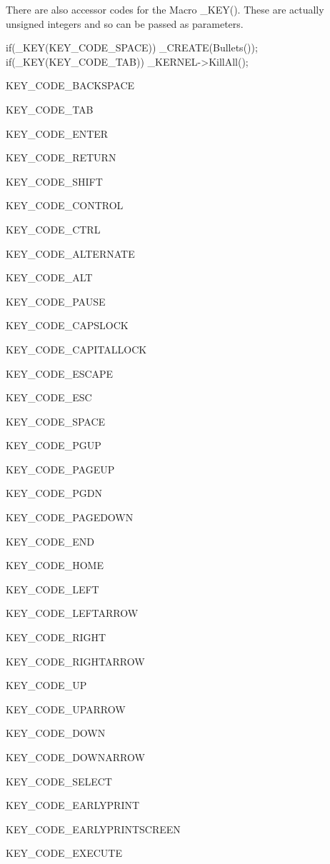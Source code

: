There are also accessor codes for the Macro \_\-KEY(). These are actually unsigned integers and so can be passed as parameters.


\begin{DoxyCode}
 if(_KEY(KEY_CODE_SPACE)) _CREATE(Bullets());
 if(_KEY(KEY_CODE_TAB)) _KERNEL->KillAll();
\end{DoxyCode}


KEY\_\-CODE\_\-BACKSPACE \par
 KEY\_\-CODE\_\-TAB \par
 KEY\_\-CODE\_\-ENTER \par
 KEY\_\-CODE\_\-RETURN \par
 KEY\_\-CODE\_\-SHIFT \par
 KEY\_\-CODE\_\-CONTROL \par
 KEY\_\-CODE\_\-CTRL \par
 KEY\_\-CODE\_\-ALTERNATE \par
 KEY\_\-CODE\_\-ALT \par
 KEY\_\-CODE\_\-PAUSE \par
 KEY\_\-CODE\_\-CAPSLOCK \par
 KEY\_\-CODE\_\-CAPITALLOCK \par
 KEY\_\-CODE\_\-ESCAPE \par
 KEY\_\-CODE\_\-ESC \par
 KEY\_\-CODE\_\-SPACE \par
 KEY\_\-CODE\_\-PGUP \par
 KEY\_\-CODE\_\-PAGEUP \par
 KEY\_\-CODE\_\-PGDN \par
 KEY\_\-CODE\_\-PAGEDOWN \par
 KEY\_\-CODE\_\-END \par
 KEY\_\-CODE\_\-HOME \par
 KEY\_\-CODE\_\-LEFT \par
 KEY\_\-CODE\_\-LEFTARROW \par
 KEY\_\-CODE\_\-RIGHT \par
 KEY\_\-CODE\_\-RIGHTARROW \par
 KEY\_\-CODE\_\-UP \par
 KEY\_\-CODE\_\-UPARROW \par
 KEY\_\-CODE\_\-DOWN \par
 KEY\_\-CODE\_\-DOWNARROW \par
 KEY\_\-CODE\_\-SELECT \par
 KEY\_\-CODE\_\-EARLYPRINT \par
 KEY\_\-CODE\_\-EARLYPRINTSCREEN \par
 KEY\_\-CODE\_\-EXECUTE \par
